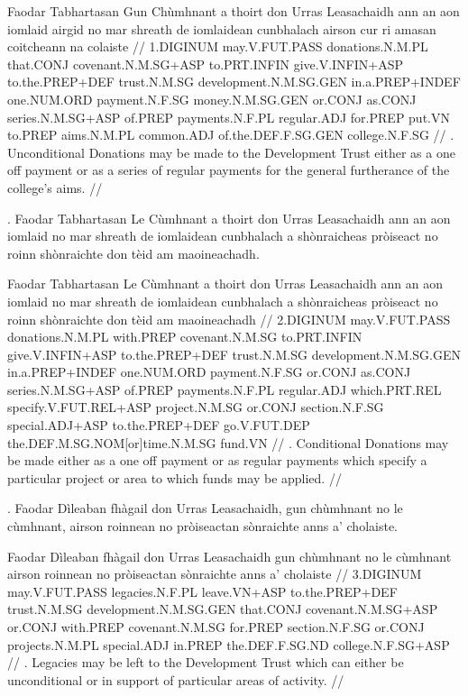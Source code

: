 \documentclass[a4paper,10pt]{article}
\begin{document}
\vspace{4mm}
 Faodar Tabhartasan Gun Chùmhnant a thoirt don Urras Leasachaidh {ann an} aon iomlaid airgid no mar shreath de iomlaidean cunbhalach airson cur ri amasan coitcheann na colaiste  //
\glb 1.DIGINUM may.V.FUT.PASS donations.N.M.PL that.CONJ covenant.N.M.SG+ASP to.PRT.INFIN give.V.INFIN+ASP to.the.PREP+DEF trust.N.M.SG development.N.M.SG.GEN in.a.PREP+INDEF one.NUM.ORD payment.N.F.SG money.N.M.SG.GEN or.CONJ as.CONJ series.N.M.SG+ASP of.PREP payments.N.F.PL regular.ADJ for.PREP put.VN to.PREP aims.N.M.PL common.ADJ of.the.DEF.F.SG.GEN college.N.F.SG  //
. Unconditional Donations may be made to the Development Trust either as a one off payment or as a series of regular payments for the general furtherance of the college's aims. //
\endgl
\xe

\ex
\begingl
{}. Faodar Tabhartasan Le Cùmhnant a thoirt don Urras Leasachaidh ann an aon iomlaid no mar shreath de iomlaidean cunbhalach a shònraicheas pròiseact no roinn shònraichte don tèid am maoineachadh. 

\vspace{4mm}
 Faodar Tabhartasan Le Cùmhnant a thoirt don Urras Leasachaidh {ann an} aon iomlaid no mar shreath de iomlaidean cunbhalach a shònraicheas pròiseact no roinn shònraichte don tèid am maoineachadh  //
\glb 2.DIGINUM may.V.FUT.PASS donations.N.M.PL with.PREP covenant.N.M.SG to.PRT.INFIN give.V.INFIN+ASP to.the.PREP+DEF trust.N.M.SG development.N.M.SG.GEN in.a.PREP+INDEF one.NUM.ORD payment.N.F.SG or.CONJ as.CONJ series.N.M.SG+ASP of.PREP payments.N.F.PL regular.ADJ which.PRT.REL specify.V.FUT.REL+ASP project.N.M.SG or.CONJ section.N.F.SG special.ADJ+ASP to.the.PREP+DEF go.V.FUT.DEP the.DEF.M.SG.NOM[or]time.N.M.SG fund.VN  //
. Conditional Donations may be made either as a one off payment or as regular payments which specify a particular project or area to which funds may be applied. //
\endgl
\xe

\ex
\begingl
{}. Faodar Dìleaban fhàgail don Urras Leasachaidh, gun chùmhnant no le cùmhnant, airson roinnean no pròiseactan sònraichte anns a' cholaiste. 

\vspace{4mm}
 Faodar Dìleaban fhàgail don Urras Leasachaidh gun chùmhnant no le cùmhnant airson roinnean no pròiseactan sònraichte anns a' cholaiste  //
\glb 3.DIGINUM may.V.FUT.PASS legacies.N.F.PL leave.VN+ASP to.the.PREP+DEF trust.N.M.SG development.N.M.SG.GEN that.CONJ covenant.N.M.SG+ASP or.CONJ with.PREP covenant.N.M.SG for.PREP section.N.F.SG or.CONJ projects.N.M.PL special.ADJ in.PREP the.DEF.F.SG.ND college.N.F.SG+ASP  //
. Legacies may be left to the Development Trust which can either be unconditional or in support of particular areas of activity. //
\endgl
\xe
\end{document}
